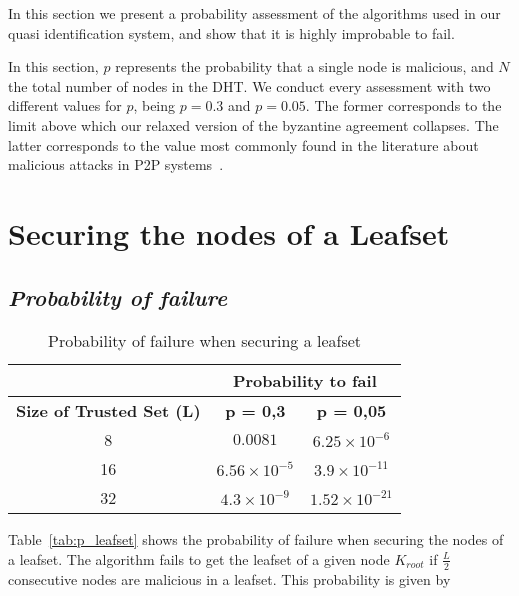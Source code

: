 In this section we present a probability assessment of
the algorithms used in our quasi identification system, and show that it is highly
improbable to fail.

In this section, $p$ represents the probability that a single node is
malicious, and $N$ the total number of nodes in the DHT. We conduct every
assessment with two different values for $p$, being $p = 0.3$ and $p = 0.05$.
The former corresponds to the limit above which our relaxed version of the
byzantine agreement collapses. The latter corresponds to the value most
commonly found in the literature about malicious attacks in P2P
systems~\cite{p2p_certification}.


\section{Securing the nodes of a Leafset}
\label{sec:eval_leafset}
  
  \subsection{\textit{Probability of failure}}
  
  \begin{table}
    \centering
    \footnotesize
    \begin{tabular}{|c|c|c|}
      \cline{2-3}
      \multicolumn{1}{c|}{}&  \multicolumn{2}{c|}{\textbf{Probability to fail}} \\ \cline{2-3}
      \hline
      \textbf{Size of Trusted Set (L)} & \textbf{p = 0,3} & \textbf{p = 0,05} \\
      \hline \hline
      8 &  $0.0081$              & $6.25 \times 10^{-6}$  \\
      \hline
      16 & $6.56 \times 10^{-5}$ & $ 3.9 \times 10^{-11}$ \\
      \hline
      32 & $4.3 \times 10^{-9}$  & $ 1.52 \times 10^{-21} $  \\
      \hline
    \end{tabular}
    \caption{Probability of failure when securing a leafset}
    \label{tab:p_leafset}
  \end{table}
  
  Table~\eqref{tab:p_leafset} shows the probability of failure when securing the
  nodes of a leafset. The algorithm fails to get the leafset of a given node
  $K_{root}$ if $\frac{L}{2}$ consecutive nodes are malicious in a leafset. This
  probability is given by
  
